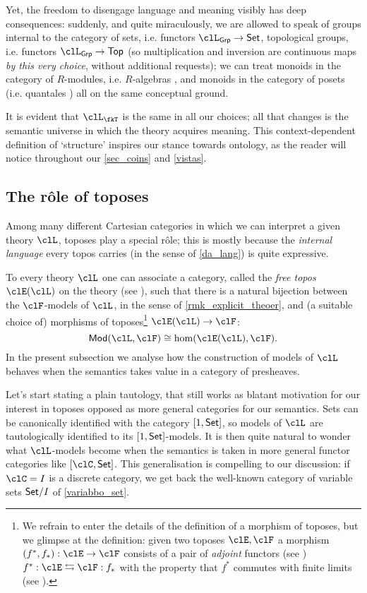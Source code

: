 Yet, the freedom to disengage language and meaning visibly has deep consequences: suddenly, and quite miraculously, we are allowed to speak of groups internal to the category of sets, i.e. functors $\clL_{\cate{Grp}} \to \Set$, topological groups, i.e. functors $\clL_{\cate{Grp}} \to \cate{Top}$ (so multiplication and inversion are continuous maps \emph{by this very choice}, without additional requests); we can treat monoids in the category of $R$-modules, i.e. $R$-algebras \cite[IV]{book337527}, and monoids in the category of posets (i.e. quantales \cite{Paseka2000}) all on the same conceptual ground.

It is evident that $\clL_{\fkT}$ is the same in all our choices; all that changes is the semantic universe in which the theory acquires meaning. This context-dependent definition of `structure' inspires our stance towards ontology, as the reader will notice throughout our \autoref{sec_coins} and \autoref{vistas}.

\subsection{The r\^ole of toposes}
Among many different Cartesian categories in which we can interpret a given theory $\clL$, toposes play a special r\^ole; this is mostly because the \emph{internal language} every topos carries (in the sense of \autoref{da_lang}) is quite expressive.

To every theory $\clL$ one can associate a category, called the \emph{free topos} $\clE(\clL)$ on the theory (see \cite{lambek1988introduction}), such that there is a natural bijection between the $\clF$-models of $\clL$, in the sense of  \autoref{rmk_explicit_theoer}, and (a suitable choice of) morphisms of toposes\footnote{We refrain to enter the details of the definition of a morphism of toposes, but we glimpse at the definition: given two toposes $\clE,\clF$ a morphism $(f^*,f_*): \clE \to \clF$ consists of a pair of \emph{adjoint} functors (see \cite[3]{Bor1}) $f^*: \clE \leftrightarrows \clF: f_*$ with the property that $f^*$ commutes with finite limits (see \cite[2.8.2]{Bor1}).} $\clE(\clL) \to \clF$:
\[\cate{Mod}(\clL, \clF) \cong \hom(\clE(\clL), \clF).\]
In the present subsection we analyse how the construction of models of $\clL$ behaves when the semantics takes value in a category of presheaves.%

Let's start stating a plain tautology, that still works as blatant motivation for our interest in toposes opposed as more general categories for our semantics. Sets can be canonically identified with the category $[1,\mathsf{Set}]$, so models of $\clL$ are tautologically identified to its $[1,\mathsf{Set}]$-models. It is then quite natural to wonder what $\clL$-models become when the semantics is taken in more general functor categories like $[\clC,\Set]$. This generalisation is compelling to our discussion: if $\clC=I$ is a discrete category, we get back the well-known category of variable sets $\mathsf{Set}/I$ of \autoref{variabbo_set}.

